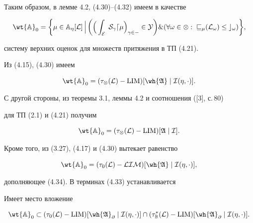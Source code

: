Таким образом, в лемме 4.2, (4.30)--(4.32) имеем в качестве


\begin{equation}


\wt{\Bbb A}_0=\bigg\{\mu\in\Bbb A_\eta[\cal L]\,\Big|\,


\bigg(\Big(\int_E\;S_\gamma d\mu\Big)_{\gamma \in \Gamma}\in Y\bigg) \&


(\forall\omega\in\Omega:\;v_\mu(L_\omega)\le c_\omega)\bigg\},


\end{equation}


систему верхних оценок для множеств притяжения в ТП (4.21).


Из (4.15), (4.30) имеем


\begin{equation}


\wt{\Bbb A}_0=(\tau_\otimes(\cal L)-


\LIM)[\wh{\frak A}\mid\cal I(\eta,\cdot)].


\end{equation}


С другой стороны, из теоремы 3.1, леммы 4.2 и соотношения ([3], с.\,80)


для ТП (2.1) и (4.21) получим


\begin{equation}


\wt{\Bbb A}_0=(\tau_\otimes(\cal L)-


\LIM)[\frak A\mid\cal I].


\end{equation}


Кроме того, из (3.27), (4.17) и (4.30) вытекает равенство


\begin{equation}


\wt{\Bbb A}_0=(\tau_0(\cal L)-LIM)[\wh{\frak A}\mid


\cal I(\eta,\cdot)],


\end{equation}


дополняющее (4.34). В терминах (4.33) устанавливается





\begin{lems}


Имеет место вложение


\begin{equation}


\wt{\Bbb A}_0\subset(\tau_0(\cal L)-\LIM)[


\wh{\frak A}_\partial\mid\cal I(\eta,\cdot)]\cap


(\tau^*_{\Bbb B}(\cal L)-\LIM)[\wh{\frak A}_\partial\mid


\cal I(\eta,\cdot)].


\end{equation}


\end{lems}





